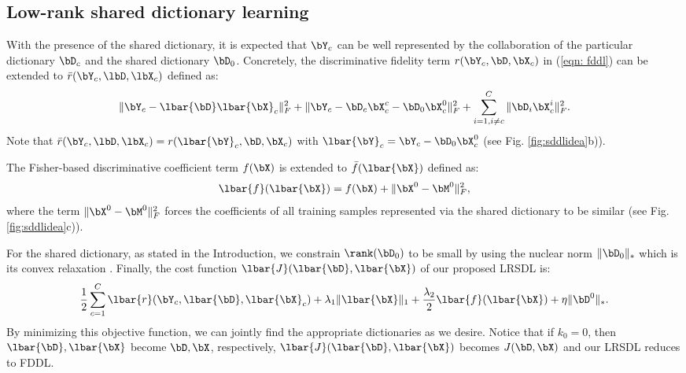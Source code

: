 \documentclass[letterpaper]{article}
\begin{document}
\subsection{Low-rank shared dictionary learning } %
\label{sub:low_rand_shared_dictionary_learning_}
With the presence of the shared dictionary, it is expected that $\bY_c$ can be well represented by the collaboration of the particular dictionary $\bD_c$ and the shared dictionary $\bD_0$. Concretely, the discriminative fidelity term $r(\bY_c, \bD, \bX_c)$ in (\ref{eqn: fddl}) can be extended to $\bar{r}(\bY_c, \lbD, \lbX_c)$ defined as:
\vspace{-0.05in}
\begin{equation*}
    \|\bY_c - \lbar{\bD}\lbar{\bX}_c\|_F^2 + \|\bY_c - \bD_c\bX_c^c - \bD_0\bX^0_c\|_F^2 + \sum_{i = 1, i\neq c}^C \|\bD_i\bX^i_c\|_F^2.
\end{equation*}
Note that $\bar{r}(\bY_c, \lbD, \lbX_c) = r(\lbar{\bY}_c, \bD, \bX_c)$ with $\lbar{\bY}_c = \bY_c - \bD_0\bX^0_c$ (see Fig. \ref{fig:sddlidea}b)).
\par
The Fisher-based discriminative coefficient term $f(\bX)$ is extended to $\bar{f}(\lbar{\bX})$ defined as:
\vspace{-0.05in}
\begin{equation}
\label{eqn:deffbar}
    \lbar{f}(\lbar{\bX}) = f(\bX) + \|\bX^0 -\bM^0\|_F^2,
\end{equation}
where the term $\|\bX^0 -\bM^0\|_F^2$ forces the coefficients of all training samples represented via the shared dictionary to be similar (see Fig. \ref{fig:sddlidea}c)).
\par For the shared dictionary, as stated in the Introduction, we constrain $\rank(\bD_0)$ to be small by using the nuclear norm $\|\bD_0\|_*$ which is its convex relaxation \cite{recht2010guaranteed}. Finally, the cost function $\lbar{J}(\lbar{\bD}, \lbar{\bX})$ of our proposed LRSDL is:
\vspace{-0.1in}
\begin{equation}
\label{eqn:mainsddl}
   \frac{1}{2}\sum_{c=1}^C \lbar{r}(\bY_c, \lbar{\bD}, \lbar{\bX}_c) + \lambda_1\|\lbar{\bX}\|_1 + \frac{\lambda_2}{2} \lbar{f}(\lbar{\bX}) + \eta \|\bD^0\|_*.
\end{equation}
By minimizing this objective function, we can jointly find the appropriate dictionaries as we desire. Notice that if $k_0 = 0$, then $\lbar{\bD}, \lbar{\bX}$ become $\bD, \bX$, respectively, $\lbar{J}(\lbar{\bD}, \lbar{\bX}) $ becomes $J(\bD, \bX)$ and our LRSDL reduces to FDDL.
\par
\end{document}
